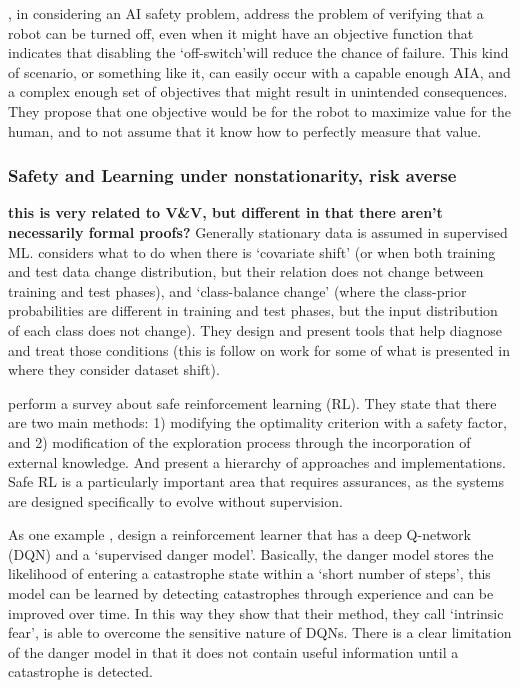     \citet{Hadfield-Menell2016-ws}, in considering an AI safety problem, address the problem of verifying that a robot can be turned off, even when it might have an objective function that indicates that disabling the `off-switch'will reduce the chance of failure. This kind of scenario, or something like it, can easily occur with a capable enough AIA, and a complex enough set of objectives that might result in unintended consequences. They propose that one objective would be for the robot to maximize value for the human, and to not assume that it know how to perfectly measure that value.

\subsubsection{Safety and Learning under nonstationarity, risk averse} \textbf{this is very related to V\&V, but different in that there aren't necessarily formal proofs?}
    Generally stationary data is assumed in supervised ML. \citet{Sugiyama2013-ci} considers what to do when there is `covariate shift' (or when both training and test data change distribution, but their relation does not change between training and test phases), and `class-balance change' (where the class-prior probabilities are different in training and test phases, but the input distribution of each class does not change). They design and present tools that help diagnose and treat those conditions (this is follow on work for some of what is presented in \citet{Quinonero-Candela2009-fj} where they consider dataset shift). 

    \citet{Garcia2015-rs} perform a survey about safe reinforcement learning (RL). They state that there are two main methods: 1) modifying the optimality criterion with a safety factor, and 2) modification of the exploration process through the incorporation of external knowledge. And present a hierarchy of approaches and implementations. Safe RL is a particularly important area that requires assurances, as the systems are designed specifically to evolve without supervision.

    As one example \citet{Lipton2016-dq}, design a reinforcement learner that has a deep Q-network (DQN) and a `supervised danger model'. Basically, the danger model stores the likelihood of entering a catastrophe state within a `short number of steps', this model can be learned by detecting catastrophes through experience and can be improved over time.  In this way they show that their method, they call `intrinsic fear', is able to overcome the sensitive nature of DQNs. There is a clear limitation of the danger model in that it does not contain useful information until a catastrophe is detected.
    
